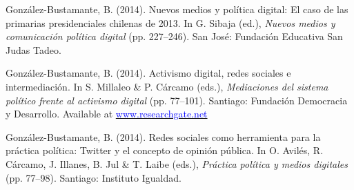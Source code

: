 \begin{publications}
\begin{benumerate}{12}
\item{González-Bustamante, B. (2014). Nuevos medios y política digital: El caso de las primarias presidenciales chilenas de 2013. In G. Sibaja (ed.), {\itshape Nuevos  medios y comunicación política digital} (pp. 227--246). San José: Fundación Educativa San Judas Tadeo.}\vspace{1mm}


\item{González-Bustamante, B. (2014). Activismo digital, redes sociales e intermediación. In S. Millaleo \& P. C\'arcamo (eds.), {\itshape Mediaciones del  sistema político frente al activismo digital} (pp. 77--101). Santiago: Fundación Democracia y Desarrollo. Available at \href{https://www.researchgate.net/publication/321992867_Activismo_digital_redes_sociales_e_intermediacion}{\textcolor{blue}{www.researchgate.net}}}\vspace{1mm}


\item{González-Bustamante, B. (2014). Redes sociales como herramienta para la práctica política: Twitter y el concepto de opinión pública. In O. Avilés, R. Cárcamo, J. Illanes, B. Jul \& T. Laibe (eds.), {\itshape Práctica política y medios digitales} (pp. 77--98). Santiago: Instituto Igualdad.}\vspace{1mm}



\end{benumerate}
\end{publications}

